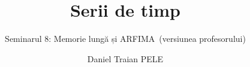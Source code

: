 \title[Serii de timp]{Serii de timp}
\subtitle{Seminarul 8: Memorie lungă și ARFIMA\ifsolutions\ (versiunea profesorului)\fi}
\author[D.T. Pele]{Daniel Traian PELE}
\date{}

\providecommand{\tsaapplink}[3]{\hypertarget{#2}{}\hyperlink{#1}{\beamergotobutton{#3}}}  %
\providecommand{\tsaappback}[2]{\begin{tikzpicture}[remember picture,overlay]\node[anchor=south east] at ([xshift=-3mm,yshift=7mm]current page.south east){\hyperlink{#1}{\beamerreturnbutton{#2}}};\end{tikzpicture}}  %
\providecommand{\tsachlink}[2]{\href{#1}{#2}}  %
\providecommand{\tsachlinkt}[2]{\href{#1}{\usebeamercolor[fg]{frametitle}#2}}  %


